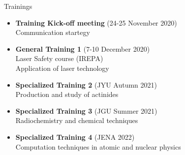 \documentclass[10pt]{beamer}
\begin{document}
\begin{frame}{Trainings}
	\begin{itemize}
		\item{	\textbf{\color{olive}Training Kick-off meeting} (24-25 November 2020)\\
				Communication startegy
		}
		\item{ 	\textbf{\color{olive}General Training 1} (7-10 December 2020)\\
				Laser Safety course (IREPA)\\
				Application of laser technology
		}
		\item{	\textbf{Specialized Training 2} (JYU Autumn 2021)\\
				Production and study of actinides

		}
		\item{	\textbf{Specialized Training 3} (JGU Summer 2021)\\
				Radiochemistry and chemical techniques
		}
		\item{	\textbf{Specialized Training 4} (JENA 2022)\\
				Computation techniques in atomic and nuclear physics
		}
	\end{itemize}

	
\end{frame}
\end{document}
